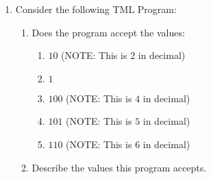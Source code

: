 \documentclass[answers]{exam}
\begin{document}
    \begin{enumerate}
        \item Consider the following TML Program:
        

        \begin{enumerate}
            \item Does the program accept the values:
            \begin{enumerate}
                \item $10$ (NOTE: This is $2$ in decimal)
                \begin{solution}
                    
                \end{solution}
                
                \item $1$
                \begin{solution}
                    
                \end{solution}
                
                \item $100$ (NOTE: This is $4$ in decimal)
                \begin{solution}
                    
                \end{solution}
                
                \item $101$ (NOTE: This is $5$ in decimal)
                \begin{solution}
                    
                \end{solution}
                
                \item $110$ (NOTE: This is $6$ in decimal)
                \begin{solution}
                    
                \end{solution}
            \end{enumerate}
            
            \item Describe the values this program accepts.
            \begin{solution}
                \vspace*{30pt}
            \end{solution}
        \end{enumerate}
        \newpage


\end{enumerate}
\end{document}
